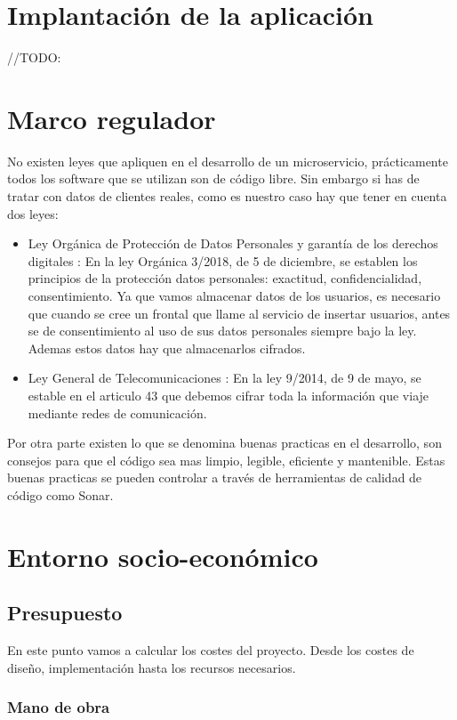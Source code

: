 \documentclass[12pt]{report} %
\begin{document}
\chapter{Implantación de la aplicación} 
 //TODO:
 
\chapter{Marco regulador}

No existen leyes que apliquen en el desarrollo de un microservicio, prácticamente todos los software que se utilizan son de código libre. Sin embargo si has de tratar con datos de clientes reales, como es nuestro caso hay que tener en cuenta dos leyes:
\begin{itemize}
	\item Ley Orgánica de Protección de Datos Personales y garantía de los derechos digitales \cite{LeyProteccion}: En la ley Orgánica 3/2018, de 5 de diciembre, se establen los principios de la protección datos personales: exactitud, confidencialidad, consentimiento.  Ya que vamos almacenar datos de los usuarios, es necesario que cuando se cree un frontal que llame al servicio de insertar usuarios, antes se de consentimiento al uso de sus datos personales siempre bajo la ley. Ademas estos datos hay que almacenarlos cifrados.
	\item Ley General de Telecomunicaciones \cite{LeyComunicaciones}: En la ley 9/2014, de 9 de mayo, se estable en el articulo 43 que debemos cifrar toda la información que viaje mediante redes de comunicación. 
\end{itemize}

Por otra parte existen lo que se denomina buenas practicas en el desarrollo, son consejos para que el código sea mas limpio, legible, eficiente y mantenible. Estas buenas practicas se pueden controlar a través de herramientas de calidad de código como Sonar.

\chapter{Entorno socio-económico}	

\section{Presupuesto}
En este punto vamos a calcular los costes del proyecto. Desde los costes de diseño, implementación hasta los recursos necesarios.

\subsection{Mano de obra}
\end{document}

